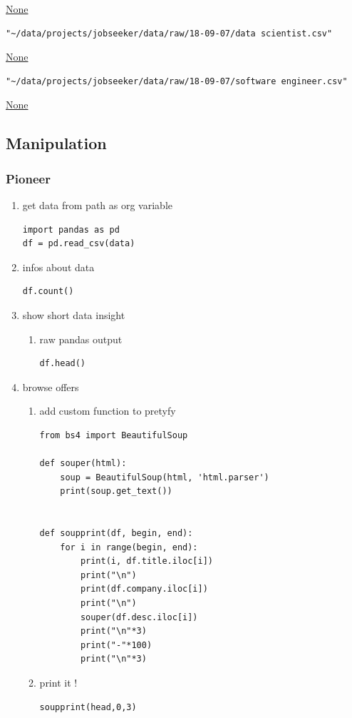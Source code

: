 \documentclass[11pt]{article}
\begin{document}
\url{None}

\begin{verbatim}
"~/data/projects/jobseeker/data/raw/18-09-07/data scientist.csv"
\end{verbatim}

\url{None}

\begin{verbatim}
"~/data/projects/jobseeker/data/raw/18-09-07/software engineer.csv"
\end{verbatim}

\url{None}
\subsection{Manipulation}
\label{sec:orgee56492}
\subsubsection{Pioneer}
\label{sec:orge2059f0}
\begin{enumerate}
\item get data from path as org variable
\label{sec:orga5dc457}
\begin{verbatim}
import pandas as pd
df = pd.read_csv(data)
\end{verbatim}

\item infos about data
\label{sec:org7a13beb}
\begin{verbatim}
df.count()
\end{verbatim}

\item show short data insight
\label{sec:org6c1be8e}
\begin{enumerate}
\item raw pandas output
\label{sec:org4e31503}
\begin{verbatim}
df.head()
\end{verbatim}
\end{enumerate}

\item browse offers
\label{sec:org25c4026}
\begin{enumerate}
\item add custom function to pretyfy
\label{sec:org798f425}
\begin{verbatim}
from bs4 import BeautifulSoup

def souper(html):
    soup = BeautifulSoup(html, 'html.parser')
    print(soup.get_text())


def soupprint(df, begin, end):
    for i in range(begin, end):
        print(i, df.title.iloc[i])
        print("\n")
        print(df.company.iloc[i])
        print("\n")
        souper(df.desc.iloc[i])
        print("\n"*3)
        print("-"*100)
        print("\n"*3)

\end{verbatim}

\item print it !
\label{sec:org9c475da}
\begin{verbatim}
soupprint(head,0,3)
\end{verbatim}
\end{enumerate}
\end{enumerate}
\end{document}
